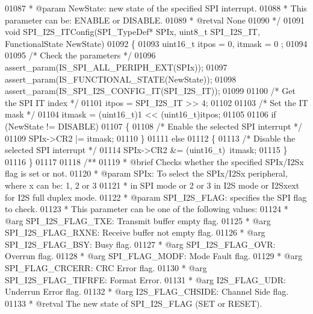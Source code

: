 \begin{DoxyCode}
01087 \textcolor{comment}{  * @param  NewState: new state of the specified SPI interrupt.}
01088 \textcolor{comment}{  *          This parameter can be: ENABLE or DISABLE.}
01089 \textcolor{comment}{  * @retval None}
01090 \textcolor{comment}{  */}
01091 \textcolor{keywordtype}{void} SPI_I2S_ITConfig(SPI\_TypeDef* SPIx, uint8\_t SPI\_I2S\_IT, FunctionalState NewState)
01092 \{
01093   uint16\_t itpos = 0, itmask = 0 ;
01094 
01095   \textcolor{comment}{/* Check the parameters */}
01096   assert_param(IS\_SPI\_ALL\_PERIPH\_EXT(SPIx));
01097   assert_param(IS\_FUNCTIONAL\_STATE(NewState));
01098   assert_param(IS\_SPI\_I2S\_CONFIG\_IT(SPI\_I2S\_IT));
01099 
01100   \textcolor{comment}{/* Get the SPI IT index */}
01101   itpos = SPI\_I2S\_IT >> 4;
01102 
01103   \textcolor{comment}{/* Set the IT mask */}
01104   itmask = (uint16\_t)1 << (uint16\_t)itpos;
01105 
01106   \textcolor{keywordflow}{if} (NewState != DISABLE)
01107   \{
01108     \textcolor{comment}{/* Enable the selected SPI interrupt */}
01109     SPIx->CR2 |= itmask;
01110   \}
01111   \textcolor{keywordflow}{else}
01112   \{
01113     \textcolor{comment}{/* Disable the selected SPI interrupt */}
01114     SPIx->CR2 &= (uint16\_t)~itmask;
01115   \}
01116 \}
01117 
01118 \textcolor{comment}{/**}
01119 \textcolor{comment}{  * @brief  Checks whether the specified SPIx/I2Sx flag is set or not.}
01120 \textcolor{comment}{  * @param  SPIx: To select the SPIx/I2Sx peripheral, where x can be: 1, 2 or 3 }
01121 \textcolor{comment}{  *         in SPI mode or 2 or 3 in I2S mode or I2Sxext for I2S full duplex mode. }
01122 \textcolor{comment}{  * @param  SPI\_I2S\_FLAG: specifies the SPI flag to check. }
01123 \textcolor{comment}{  *          This parameter can be one of the following values:}
01124 \textcolor{comment}{  *            @arg SPI\_I2S\_FLAG\_TXE: Transmit buffer empty flag.}
01125 \textcolor{comment}{  *            @arg SPI\_I2S\_FLAG\_RXNE: Receive buffer not empty flag.}
01126 \textcolor{comment}{  *            @arg SPI\_I2S\_FLAG\_BSY: Busy flag.}
01127 \textcolor{comment}{  *            @arg SPI\_I2S\_FLAG\_OVR: Overrun flag.}
01128 \textcolor{comment}{  *            @arg SPI\_FLAG\_MODF: Mode Fault flag.}
01129 \textcolor{comment}{  *            @arg SPI\_FLAG\_CRCERR: CRC Error flag.}
01130 \textcolor{comment}{  *            @arg SPI\_I2S\_FLAG\_TIFRFE: Format Error.}
01131 \textcolor{comment}{  *            @arg I2S\_FLAG\_UDR: Underrun Error flag.}
01132 \textcolor{comment}{  *            @arg I2S\_FLAG\_CHSIDE: Channel Side flag.  }
01133 \textcolor{comment}{  * @retval The new state of SPI\_I2S\_FLAG (SET or RESET).}

\end{DoxyCode}
